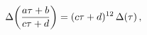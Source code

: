 \[\mathop{\Delta\/}\nolimits\!\left(\frac{a\tau+b}{c\tau+d}\right)=(c\tau+d)^{12%
}\mathop{\Delta\/}\nolimits\!\left(\tau\right),\]